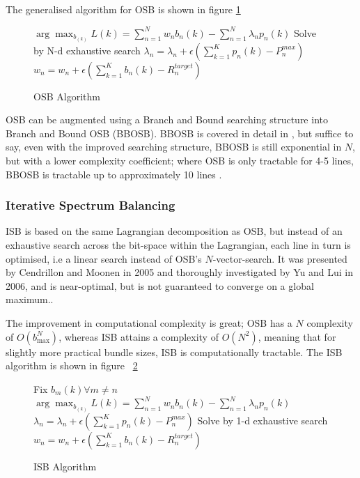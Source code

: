 The generalised algorithm for OSB is shown in figure \ref{fig:OSBAlgorithm}

\begin{figure}[!h]
\begin{algorithmic}
\REPEAT
\REPEAT
{}
\STATE \(\arg\max_{b_(k)}L(k)=\sum_{n=1}^Nw_nb_n(k)-\sum_{n=1}^N\lambda_np_n(k)\)
\STATE Solve by N-d exhaustive search
\ENDFOR
\STATE \(\lambda_n=\lambda_n+\epsilon(\sum_{k=1}^Kp_n(k)-P_n^{max})\)
\STATE \(w_n=w_n+\epsilon(\sum_{k=1}^Kb_n(k)-R_n^{target})\)
\end{algorithmic}
\caption{OSB Algorithm}
\label{fig:OSBAlgorithm}
\end{figure}

OSB can be augmented using a Branch and Bound searching structure into Branch and Bound OSB (BBOSB). BBOSB is covered in detail in \cite{PT06}, but suffice to say, even with the improved searching structure, BBOSB is still exponential in \(N\), but with a lower complexity coefficient; where OSB is only tractable for 4-5 lines, BBOSB is tractable up to approximately 10 lines \cite{AM09}.

\subsubsection{Iterative Spectrum Balancing}
ISB is based on the same Lagrangian decomposition as OSB, but instead of an exhaustive search across the bit-space within the Lagrangian, each line in turn is optimised, i.e a linear search instead of OSB's \(N\)-vector-search. It was presented\cite{Cen05} by Cendrillon and Moonen in 2005 and thoroughly investigated by Yu and Lui\cite{WYaRL06} in 2006, and is near-optimal, but is not guaranteed to converge on a global maximum.\cite{Cen05}.

The improvement in computational complexity is great; OSB has a \(N\) complexity of \(O(b_{\text{max}}^N)\), whereas ISB attains a complexity of \(O(N^2)\), meaning that for slightly more practical bundle sizes, ISB is computationally tractable. The ISB algorithm is shown in figure ~\ref{fig:ISBAlgorithm}

\begin{figure}[h!]
\begin{algorithmic}
\REPEAT
{}
\REPEAT
{}
\STATE Fix \(b_m(k)\forall m \neq n\)
\STATE \(\arg\max_{b_(k)}L(k)=\sum_{n=1}^Nw_nb_n(k)-\sum_{n=1}^N\lambda_np_n(k)\)
\STATE \(\lambda_n=\lambda_n+\epsilon(\sum_{k=1}^Kp_n(k)-P_n^{max})\)
\STATE Solve by 1-d exhaustive search
\ENDFOR
{}
\ENDFOR
\STATE \(w_n=w_n+\epsilon(\sum_{k=1}^Kb_n(k)-R_n^{target})\)
\end{algorithmic}
\caption{ISB Algorithm}
\label{fig:ISBAlgorithm}
\end{figure}

